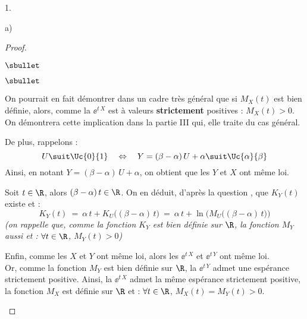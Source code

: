 \documentclass[11pt]{article}%
\begin{document}
\begin{noliste}{1.}
\begin{noliste}{a)}
\begin{proof}
\begin{noliste}{$\sbullet$}
\begin{remarkL}{.95}
\begin{noliste}{$\sbullet$}
          \item On pourrait en fait démontrer dans un cadre très
            général que si $M_X(t)$ est bien définie, alors, comme la
            \var $\ee^{t \, X}$ est à valeurs {\bf strictement}
            positives : $M_X(t) >0$.\\
            On démontrera cette implication dans la partie III qui,
            elle traite du cas général.
          \end{noliste}
        \end{remarkL}
        
      \item De plus, rappelons :
        \[
          U \suit \Uc{0}{1} \quad \Leftrightarrow \quad Y=(\beta -
          \alpha) \, U + \alpha \suit \Uc{\alpha}{\beta}
        \]
        Ainsi, en notant $Y = (\beta - \alpha) \, U + \alpha$, on
        obtient que les \var $Y$ et $X$ ont même loi.
        
      \item Soit $t \in \R$, alors $(\beta-\alpha) \, t \in \R$. On en déduit,
        d'après la question , que $K_Y(t)$ existe et :
        \[
          K_Y(t) \ = \ \alpha \, t + K_U\big((\beta-\alpha) \, t) \ = \
          \alpha \, t + \ln\Big(M_U\big((\beta-\alpha) \, t\big)\Big)
        \]
        {\it (on rappelle que, comme la fonction $K_Y$ est bien
          définie sur $\R$, la fonction $M_Y$ aussi et : $\forall t
          \in \R$, $M_Y(t) >0$)}
        
      \item Enfin, comme les \var $X$ et $Y$ ont même loi, alors les
        \var $\ee^{t \, X}$ et $\ee^{t \, Y}$ ont même loi.\\
        Or, comme la fonction $M_Y$ est bien définie sur
        $\R$, la \var $\ee^{t \, Y}$ admet une espérance strictement
        positive. Ainsi, la \var $\ee^{t \, X}$ admet la même
        espérance strictement positive, \ie la fonction $M_X$ est
        définie sur $\R$ et : $\forall t \in \R$, $M_X(t) = M_Y(t)
        >0$.
        ~\\[-1.4cm]
      \end{noliste}
    \end{proof}


    \newpage
    

\end{noliste}
\end{noliste}
\end{document}
